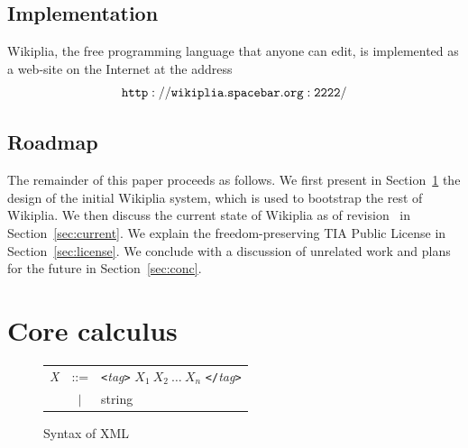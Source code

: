 \documentclass[twocolumn]{article}
\begin{document}
\subsection{Implementation}

Wikiplia, the free programming language that anyone can edit, is
implemented as a web-site on the Internet at the address
$${\tt http://wikiplia.spacebar.org:2222/}$$

\subsection{Roadmap}

The remainder of this paper proceeds as follows. We first present in
Section~\ref{sec:calculus} the design of the initial Wikiplia system,
which is used to bootstrap the rest of Wikiplia. We then discuss the
current state of Wikiplia as of revision \currentrevision\ in
Section~\ref{sec:current}. We explain the freedom-preserving TIA
Public License in Section~\ref{sec:license}. We conclude with a
discussion of unrelated work and plans for the future in
Section~\ref{sec:conc}.

\section{Core calculus} \label{sec:calculus}

\begin{figure}[ht]

\begin{center}
\begin{tabular}{rcl}
 {\em X} & ::= & {\tt<}{\em tag}{\tt >} $X_1\ X_2\ \ldots\ X_n$ {\tt</}{\em tag}{\tt >} \\
         & $|$ & string
\end{tabular}
\end{center}
\caption{Syntax of XML} \label{fig:xml}
\end{figure}
\end{document}
